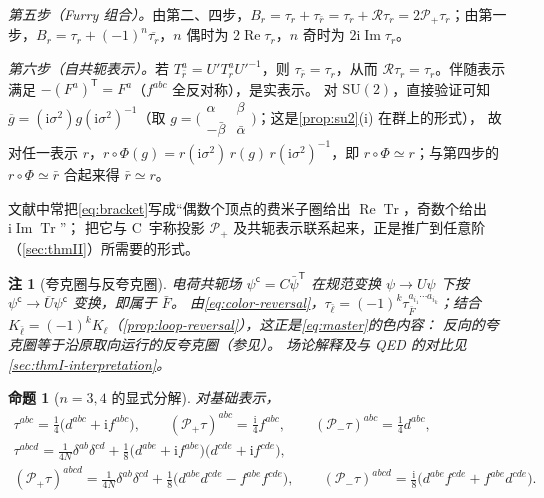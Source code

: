 \documentclass[UTF8,a4paper,11pt,fontset=fandol]{ctexart}
\makeatletter
\theoremstyle{cplain}
\newtheorem{proposition}[theorem]{命题}
\theoremstyle{cdefinition}
\theoremstyle{cremark}
\newtheorem{remark}[theorem]{注}
\renewcommand{\proofname}{证明}
\renewenvironment{proof}[1][\proofname]{\par\pushQED{\qed}\normalfont\topsep6\p@\@plus6\p@\relax
  \trivlist\item[\hskip\labelsep\itshape #1\hspace{0.5em}]\ignorespaces}{\popQED\endtrivlist\@endpefalse}
\numberwithin{equation}{section}
\DeclareMathOperator{\Tr}{Tr}
\DeclareMathOperator{\Real}{Re}
\DeclareMathOperator{\Imag}{Im}
\newcommand{\tp}{\mathsf{T}}                         %
\newcommand{\Rop}{\mathcal{R}}                       %
\newcommand{\Pp}{\mathcal{P}_{+}}                    %
\newcommand{\Pm}{\mathcal{P}_{-}}                    %
\newcommand{\ii}{\mathrm{i}}                        %
\makeatother
\begin{document}
\begin{proof}[\cref{lem:color-reversal}的证明]
\emph{第五步（Furry 组合）。}由第二、四步，$B_r=\tau_r+\tau_{\bar r}=\tau_r+\Rop\tau_r=2\Pp\tau_r$；由第一步，$B_r=\tau_r+(-1)^n\overline{\tau_r}$，$n$ 偶时为 $2\Real\tau_r$，$n$ 奇时为 $2\ii\Imag\tau_r$。

\emph{第六步（自共轭表示）。}若 $T_{\bar r}^a=U'T_r^aU'^{-1}$，则 $\tau_{\bar r}=\tau_r$，从而 $\Rop\tau_r=\tau_r$。伴随表示满足 $-(F^a)^{\tp}=F^a$（$f^{abc}$ 全反对称），是实表示。
对 $\mathrm{SU}(2)$，直接验证可知 $\overline g=(\ii\sigma^2)g(\ii\sigma^2)^{-1}$（取 $g=\bigl(\begin{smallmatrix}\alpha&\beta\\-\bar\beta&\bar\alpha\end{smallmatrix}\bigr)$；这是\cref{prop:su2}(i) 在群上的形式），
故对任一表示 $r$，$r\circ\Phi(g)=r(\ii\sigma^2)\,r(g)\,r(\ii\sigma^2)^{-1}$，即 $r\circ\Phi\simeq r$；与第四步的 $r\circ\Phi\simeq\bar r$ 合起来得 $\bar r\simeq r$。
\end{proof}

文献中常把\cref{eq:bracket}写成“偶数个顶点的费米子圈给出 $\Real\Tr$，奇数个给出 $\ii\Imag\Tr$”\cite{PastonProkhvatilovFranke1999}；
把它与 C~宇称投影 $\Pp$ 及共轭表示联系起来，正是推广到任意阶（\cref{sec:thmII}）所需要的形式。

\begin{remark}[夸克圈与反夸克圈]\label{rem:color-antiquark}
电荷共轭场 $\psi^{\mathsf c}=C\bar\psi^{\tp}$ 在规范变换 $\psi\to U\psi$ 下按 $\psi^{\mathsf c}\to\overline U\psi^{\mathsf c}$ 变换，即属于 $\bar F$。
由\cref{eq:color-reversal}，$\tau_{\bar\ell}=(-1)^k\tau_{\bar F}^{a_{i_1}\cdots a_{i_k}}$；结合 $K_{\bar\ell}=(-1)^kK_\ell$（\cref{prop:loop-reversal}），这正是\cref{eq:master}的色内容：
\emph{反向的夸克圈等于沿原取向运行的反夸克圈}（参见\cite[第~3~节]{MooreGorda2023}）。
场论解释及与 QED 的对比见\cref{sec:thmI-interpretation}。
\end{remark}

\begin{proposition}[$n=3,4$ 的显式分解]\label{prop:n34}
对基础表示，
\begin{gather}
\tau^{abc}=\tfrac14\bigl(d^{abc}+\ii f^{abc}\bigr),\qquad (\Pp\tau)^{abc}=\tfrac{\ii}{4}f^{abc},\qquad (\Pm\tau)^{abc}=\tfrac14d^{abc},\label{eq:trace3}\\
\tau^{abcd}=\tfrac{1}{4N}\delta^{ab}\delta^{cd}+\tfrac18\bigl(d^{abe}+\ii f^{abe}\bigr)\bigl(d^{cde}+\ii f^{cde}\bigr),\label{eq:trace4}\\
(\Pp\tau)^{abcd}=\tfrac{1}{4N}\delta^{ab}\delta^{cd}+\tfrac18\bigl(d^{abe}d^{cde}-f^{abe}f^{cde}\bigr),\qquad
(\Pm\tau)^{abcd}=\tfrac{\ii}{8}\bigl(d^{abe}f^{cde}+f^{abe}d^{cde}\bigr).\label{eq:P-trace4}
\end{gather}
\end{proposition}
\end{document}
